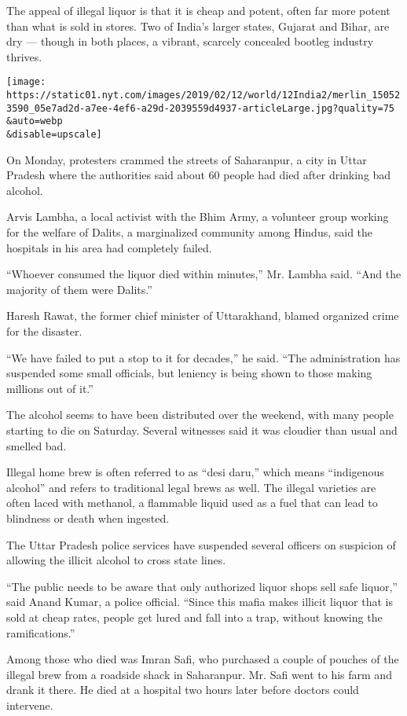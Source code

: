 The appeal of illegal liquor is that it is cheap and potent, often far
more potent than what is sold in stores. Two of India's larger states,
Gujarat and Bihar, are dry --- though in both places, a vibrant,
scarcely concealed bootleg industry thrives.

\texttt{[image: https://static01.nyt.com/images/2019/02/12/world/12India2/merlin\_150523590\_05e7ad2d-a7ee-4ef6-a29d-2039559d4937-articleLarge.jpg?quality=75\\\&auto=webp\\\&disable=upscale]}

On Monday, protesters crammed the streets of Saharanpur, a city in Uttar
Pradesh where the authorities said about 60 people had died after
drinking bad alcohol.

Arvis Lambha, a local activist with the Bhim Army, a volunteer group
working for the welfare of Dalits, a marginalized community among
Hindus, said the hospitals in his area had completely failed.

``Whoever consumed the liquor died within minutes,'' Mr. Lambha said.
``And the majority of them were Dalits.''

Haresh Rawat, the former chief minister of Uttarakhand, blamed organized
crime for the disaster.

``We have failed to put a stop to it for decades,'' he said. ``The
administration has suspended some small officials, but leniency is being
shown to those making millions out of it.''

The alcohol seems to have been distributed over the weekend, with many
people starting to die on Saturday. Several witnesses said it was
cloudier than usual and smelled bad.

Illegal home brew is often referred to as ``desi daru,'' which means
``indigenous alcohol'' and refers to traditional legal brews as well.
The illegal varieties are often laced with methanol, a flammable liquid
used as a fuel that can lead to blindness or death when ingested.

The Uttar Pradesh police services have suspended several officers on
suspicion of allowing the illicit alcohol to cross state lines.

``The public needs to be aware that only authorized liquor shops sell
safe liquor,'' said Anand Kumar, a police official. ``Since this mafia
makes illicit liquor that is sold at cheap rates, people get lured and
fall into a trap, without knowing the ramifications.''

Among those who died was Imran Safi, who purchased a couple of pouches
of the illegal brew from a roadside shack in Saharanpur. Mr. Safi went
to his farm and drank it there. He died at a hospital two hours later
before doctors could intervene.

